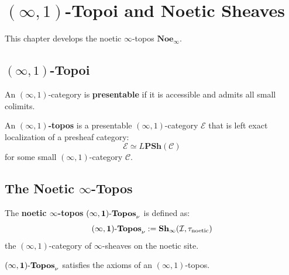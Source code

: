 
\chapter{$(\infty,1)$-Topoi and Noetic Sheaves}
\label{ch:infty-topoi}

\begin{tcolorbox}[colback=blue!5!white,colframe=blue!75!black,title=\vnewfour]
This chapter develops the noetic $\infty$-topos $\mathbf{Noe}_\infty$.
\end{tcolorbox}

\section{$(\infty,1)$-Topoi}

\begin{definition}
\label{def:presentable}
An $(\infty,1)$-category is \textbf{presentable} if it is accessible and admits
all small colimits.
\end{definition}

\begin{definition}
\label{def:infty-topos}
An \textbf{$(\infty,1)$-topos} is a presentable $(\infty,1)$-category $\mathcal{E}$
that is left exact localization of a presheaf category:
\[
\mathcal{E} \simeq L\mathbf{PSh}(\mathcal{C})
\]
for some small $(\infty,1)$-category $\mathcal{C}$.
\end{definition}

\section{The Noetic $\infty$-Topos}

\begin{definition}
\label{def:noetic-infty-topos}
The \textbf{noetic $\infty$-topos} $\mathbf{(\infty,1)\text{-}Topos}_\nu$ is defined as:
\[
\mathbf{(\infty,1)\text{-}Topos}_\nu := \mathbf{Sh}_\infty(\mathcal{I}, \tau_{\mathrm{noetic}})
\]
the $(\infty,1)$-category of $\infty$-sheaves on the noetic site.
\end{definition}

\begin{theorem}
\label{thm:noe-infty-topos}
$\mathbf{(\infty,1)\text{-}Topos}_\nu$ satisfies the axioms of an $(\infty,1)$-topos.
\end{theorem}

